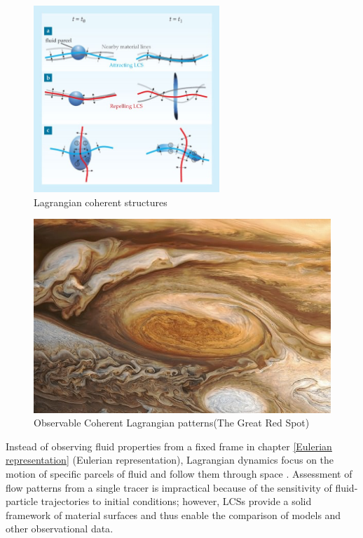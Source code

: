 \begin{figure}[ht]
  \centering
  \includegraphics[width=7cm]{chapter/figure/Lagrangian coherent structures.jpg}
  \caption
  {Lagrangian coherent structures
  \cite{peacock2013lagrangian}} 
  \label{Lagrangian coherent structures}
\end{figure}

\begin{figure}[ht]
  \centering
  \includegraphics[width=13cm]{chapter/figure/coherent structure and red spot.jpg}
  \caption
  {Observable Coherent Lagrangian patterns(The Great Red Spot)
  \cite{haller2015lagrangian}} 
  \label{red spot}
\end{figure}

Instead of observing fluid properties from a fixed frame in chapter \ref{Eulerian representation} (Eulerian representation), Lagrangian dynamics focus on the motion of specific parcels of fluid and follow them through space \cite{price2006lagrangian}. Assessment of flow patterns from a single tracer is impractical because of the sensitivity of fluid-particle trajectories to initial conditions; however, LCSs provide a solid framework of material surfaces and thus enable the comparison of models and other observational data\cite{haller2015lagrangian}. 


